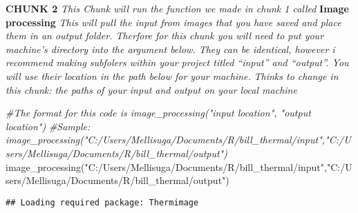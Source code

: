 \documentclass[
]{article}
\newenvironment{Shaded}{\begin{snugshade}}{\end{snugshade}}
\newcommand{\AttributeTok}[1]{\textcolor[rgb]{0.77,0.63,0.00}{#1}}
\newcommand{\CommentTok}[1]{\textcolor[rgb]{0.56,0.35,0.01}{\textit{#1}}}
\newcommand{\ConstantTok}[1]{\textcolor[rgb]{0.00,0.00,0.00}{#1}}
\newcommand{\DecValTok}[1]{\textcolor[rgb]{0.00,0.00,0.81}{#1}}
\newcommand{\FunctionTok}[1]{\textcolor[rgb]{0.00,0.00,0.00}{#1}}
\newcommand{\NormalTok}[1]{#1}
\newcommand{\SpecialCharTok}[1]{\textcolor[rgb]{0.00,0.00,0.00}{#1}}
\newcommand{\StringTok}[1]{\textcolor[rgb]{0.31,0.60,0.02}{#1}}
\begin{document}
\begin{Shaded}
\end{Shaded}

\textbf{CHUNK 2} \emph{This Chunk will run the function we made in chunk
1 called} \textbf{Image processing} \emph{This will pull the input from
images that you have saved and place them in an output folder. Therfore
for this chunk you will need to put your machine's directory into the
argument below. They can be identical, however i recommend making
subfolers within your project titled ``input'' and ``output''. You will
use their location in the path below for your machine.} \emph{Thinks to
change in this chunk: the paths of your input and output on your local
machine}

\begin{Shaded}
\begin{Highlighting}[]
\CommentTok{\#The format for this code is image\_processing("input location", "output location")}
\CommentTok{\#Sample: image\_processing("C:/Users/Mellisuga/Documents/R/bill\_thermal/input","C:/Users/Mellisuga/Documents/R/bill\_thermal/output")}
\FunctionTok{image\_processing}\NormalTok{(}\StringTok{"C:/Users/Mellisuga/Documents/R/bill\_thermal/input"}\NormalTok{,}\StringTok{"C:/Users/Mellisuga/Documents/R/bill\_thermal/output"}\NormalTok{)}
\end{Highlighting}
\end{Shaded}

\begin{verbatim}
## Loading required package: Thermimage
\end{verbatim}
\end{document}
